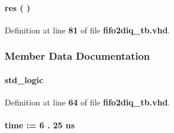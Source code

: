\paragraph[{res}]{\setlength{\rightskip}{0pt plus 5cm} {\bfseries \textcolor{vhdlchar}{ }} res ( ) \hspace{0.3cm}{\ttfamily [Process]}}\label{classfifo2diq__tb_1_1tb__behave_ab0bd7560790c13b656fd58e17e35143e}


Definition at line {\bf 81} of file {\bf fifo2diq\+\_\+tb.\+vhd}.



\subsubsection{Member Data Documentation}
\paragraph[{clk0}]{ {\bfseries \textcolor{comment}{std\+\_\+logic}\textcolor{vhdlchar}{ }} \hspace{0.3cm}{\ttfamily [Signal]}}\label{classfifo2diq__tb_1_1tb__behave_a693d72741b9413130fe2d67511b642be}


Definition at line {\bf 64} of file {\bf fifo2diq\+\_\+tb.\+vhd}.

\paragraph[{clk0\+\_\+period}]{ {\bfseries \textcolor{comment}{time}\textcolor{vhdlchar}{ }\textcolor{vhdlchar}{ }\textcolor{vhdlchar}{\+:}\textcolor{vhdlchar}{=}\textcolor{vhdlchar}{ }\textcolor{vhdlchar}{ }\textcolor{vhdlchar}{ } \textcolor{vhdldigit}{6} \textcolor{vhdlchar}{.} \textcolor{vhdldigit}{25} \textcolor{vhdlchar}{ }\textcolor{vhdlchar}{ns}\textcolor{vhdlchar}{ }} \hspace{0.3cm}{\ttfamily [Constant]}}\label{classfifo2diq__tb_1_1tb__behave_aeff8690ce469b1a2355a25018cf547fb}


